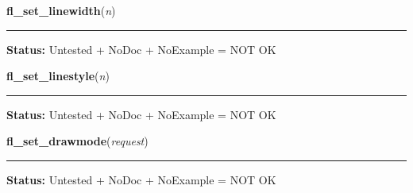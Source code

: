     \vspace{0.5ex}

\hspace{.8\funcindent}\begin{boxedminipage}{\funcwidth}

    \raggedright \textbf{fl\_set\_linewidth}(\textit{n})

    \vspace{-1.5ex}

    \rule{\textwidth}{0.5\fboxrule}
\setlength{\parskip}{2ex}
\setlength{\parskip}{1ex}
\textbf{Status:} Untested + NoDoc + NoExample = NOT OK



    \end{boxedminipage}

    \label{xformslib:library:fl_linestyle}

    \vspace{0.5ex}

\hspace{.8\funcindent}\begin{boxedminipage}{\funcwidth}

    \raggedright \textbf{fl\_set\_linestyle}(\textit{n})

    \vspace{-1.5ex}

    \rule{\textwidth}{0.5\fboxrule}
\setlength{\parskip}{2ex}
\setlength{\parskip}{1ex}
\textbf{Status:} Untested + NoDoc + NoExample = NOT OK



    \end{boxedminipage}

    \label{xformslib:library:fl_drawmode}

    \vspace{0.5ex}

\hspace{.8\funcindent}\begin{boxedminipage}{\funcwidth}

    \raggedright \textbf{fl\_set\_drawmode}(\textit{request})

    \vspace{-1.5ex}

    \rule{\textwidth}{0.5\fboxrule}
\setlength{\parskip}{2ex}
\setlength{\parskip}{1ex}
\textbf{Status:} Untested + NoDoc + NoExample = NOT OK



    \end{boxedminipage}

